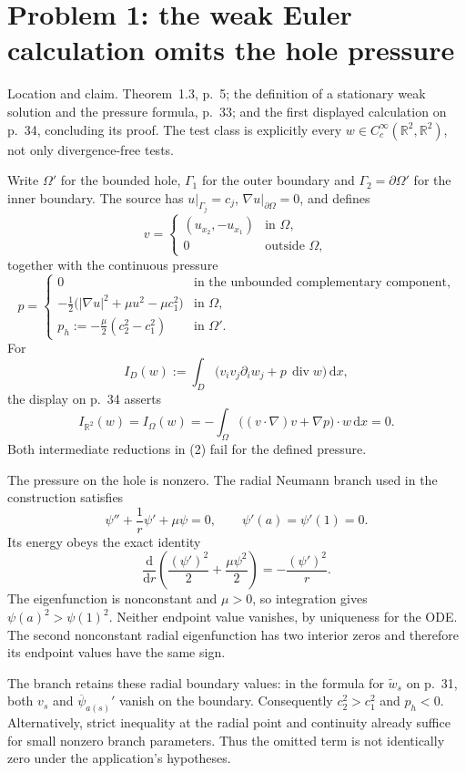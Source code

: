 \documentclass[10pt]{article}
\begin{document}
\section*{Problem 1: the weak Euler calculation omits the hole pressure}
Location and claim. Theorem 1.3, p. 5; the definition of a stationary weak solution and the pressure formula, p. 33; and the first displayed calculation on p. 34, concluding its proof. The test class is explicitly every \(w\in C_c^\infty(\mathbb R^2,\mathbb R^2)\), not only divergence-free tests.\par
Write \(\Omega'\) for the bounded hole, \(\Gamma_1\) for the outer boundary and \(\Gamma_2=\partial\Omega'\) for the inner boundary. The source has \(u|_{\Gamma_j}=c_j\), \(\nabla u|_{\partial\Omega}=0\), and defines \[v=\begin{cases}(u_{x_2},-u_{x_1})&\text{in }\Omega,\\0&\text{outside }\Omega,\end{cases}\] together with the continuous pressure \[p=\begin{cases}
 0&\text{in the unbounded complementary component},\\
 -\frac12\bigl(|\nabla u|^2+\mu u^2-\mu c_1^2\bigr)&\text{in }\Omega,\\
 p_h:=-\frac{\mu}{2}(c_2^2-c_1^2)&\text{in }\Omega'.
 \end{cases}
 \tag{1}\] For \[I_D(w):=\int_D\bigl(v_i v_j\partial_iw_j+p\,\operatorname{div}w\bigr)\,\mathrm dx,\] the display on p. 34 asserts \[I_{\mathbb R^2}(w)=I_\Omega(w)
 =-\int_\Omega\bigl((v\cdot\nabla)v+\nabla p\bigr)\cdot w\,\mathrm dx=0.
 \tag{2}\] Both intermediate reductions in (2) fail for the defined pressure.\par
The pressure on the hole is nonzero. The radial Neumann branch used in the construction satisfies \[\psi''+\frac1r\psi'+\mu\psi=0,\qquad \psi'(a)=\psi'(1)=0.\] Its energy obeys the exact identity \[\frac{\mathrm d}{\mathrm dr}
 \left(\frac{(\psi')^2}{2}+\frac{\mu\psi^2}{2}\right)
 =-\frac{(\psi')^2}{r}.
 \tag{3}\] The eigenfunction is nonconstant and \(\mu>0\), so integration gives \(\psi(a)^2>\psi(1)^2\). Neither endpoint value vanishes, by uniqueness for the ODE. The second nonconstant radial eigenfunction has two interior zeros and therefore its endpoint values have the same sign.\par
The branch retains these radial boundary values: in the formula for \(\widetilde w_s\) on p. 31, both \(v_s\) and \(\overline\psi_{a(s)}'\) vanish on the boundary. Consequently \(c_2^2>c_1^2\) and \(p_h<0\). Alternatively, strict inequality at the radial point and continuity already suffice for small nonzero branch parameters. Thus the omitted term is not identically zero under the application’s hypotheses.\par
\end{document}
